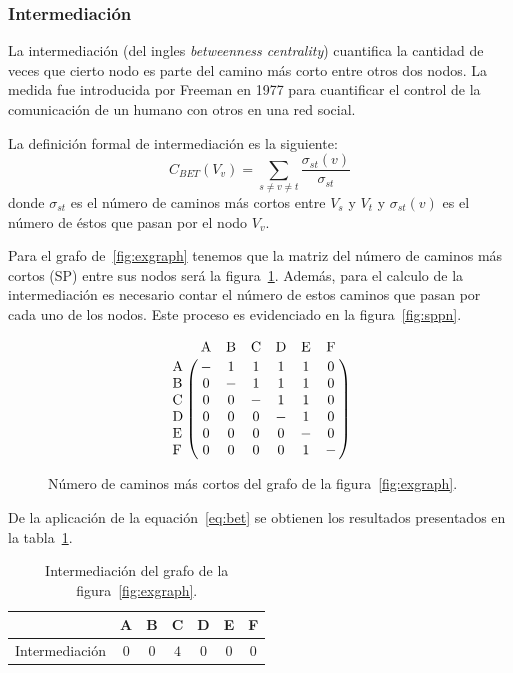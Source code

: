 \subsubsection{Intermediación}\label{ea:cent:bet}
La intermediación (del ingles \emph{betweenness centrality}) cuantifica la
cantidad de veces que cierto nodo es parte del camino más corto entre otros dos
nodos.
La medida fue introducida por Freeman en 1977\cite{freeman1977set} para
cuantificar el control de la comunicación de un humano con otros en una red
social. 

La definición formal de intermediación es la siguiente:
\begin{equation}
  \label{eq:bet}
  C_{BET}(V_v) = \sum_{s\neq v\neq t} \frac{\sigma_{st}(v)}{\sigma_{st}}
\end{equation}
donde $\sigma_{st}$ es el número de caminos más cortos entre $V_s$ y $V_t$ y 
$\sigma_{st}(v)$ es el número de éstos que pasan por el nodo $V_v$.

Para el grafo de~\ref{fig:exgraph} tenemos que la matriz del número de caminos
más cortos (SP) entre sus nodos será la figura~\ref{fig:nrosp}.
Además, para el calculo de la intermediación es necesario contar el número de
estos caminos que pasan por cada uno de los nodos.
Este proceso es evidenciado en la figura~\ref{fig:sppn}.

\begin{figure}[htpb]
  \begin{equation*}
    \bordermatrix{
       ~  & $A$ & $B$ & $C$ & $D$ & $E$ & $F$ \cr
      $A$ &  -  &  1  &  1  &  1  &  1  &  0  \cr
      $B$ &  0  &  -  &  1  &  1  &  1  &  0  \cr
      $C$ &  0  &  0  &  -  &  1  &  1  &  0  \cr
      $D$ &  0  &  0  &  0  &  -  &  1  &  0  \cr
      $E$ &  0  &  0  &  0  &  0  &  -  &  0  \cr
      $F$ &  0  &  0  &  0  &  0  &  1  &  -  \cr
    }
  \end{equation*}
  \caption{Número de caminos más cortos del grafo de la figura~\ref{fig:exgraph}.}
  \label{fig:nrosp}
\end{figure}



De la aplicación de la equación~\ref{eq:bet} se obtienen los resultados
presentados en la tabla~\ref{tab:exbet}.
\begin{table}[htpb]
  \centering
  \begin{tabular}{|l|c|c|c|c|c|c|}
    \hline         &  A  &  B  &  C  &  D  &  E  &  F  \\\hline
    Intermediación & $0$ & $0$ & $4$ & $0$ & $0$ & $0$ \\\hline
  \end{tabular}
  \caption{Intermediación del grafo de la figura~\ref{fig:exgraph}.}
  \label{tab:exbet}
\end{table}

